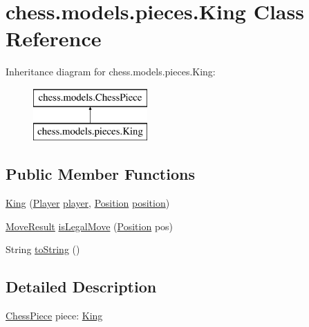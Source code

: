 \hypertarget{classchess_1_1models_1_1pieces_1_1_king}{}\section{chess.\+models.\+pieces.\+King Class Reference}
\label{classchess_1_1models_1_1pieces_1_1_king}
Inheritance diagram for chess.\+models.\+pieces.\+King\+:\begin{figure}[H]
\begin{center}
\leavevmode
\includegraphics[height=2.000000cm]{classchess_1_1models_1_1pieces_1_1_king}
\end{center}
\end{figure}
\subsection*{Public Member Functions}
\begin{DoxyCompactItemize}
\item 
\mbox{\hyperlink{classchess_1_1models_1_1pieces_1_1_king_abc06c6362a34a9f7289c374c50d3b728}{King}} (\mbox{\hyperlink{enumchess_1_1models_1_1enums_1_1_player}{Player}} \mbox{\hyperlink{classchess_1_1models_1_1_chess_piece_a3bcc8a24667318b5aab8c146adcc3eb7}{player}}, \mbox{\hyperlink{classchess_1_1models_1_1_position}{Position}} \mbox{\hyperlink{classchess_1_1models_1_1_chess_piece_a0e4f8616b75e548f269d3971846396f3}{position}})
\item 
\mbox{\hyperlink{enumchess_1_1models_1_1enums_1_1_move_result}{Move\+Result}} \mbox{\hyperlink{classchess_1_1models_1_1pieces_1_1_king_ad72471e97d1e053467189babdc18c231}{is\+Legal\+Move}} (\mbox{\hyperlink{classchess_1_1models_1_1_position}{Position}} pos)
\item 
String \mbox{\hyperlink{classchess_1_1models_1_1pieces_1_1_king_ae287258d6c093ce7d7c3196f7dde6d99}{to\+String}} ()
\end{DoxyCompactItemize}


\subsection{Detailed Description}
\mbox{\hyperlink{classchess_1_1models_1_1_chess_piece}{Chess\+Piece}} piece\+: \mbox{\hyperlink{classchess_1_1models_1_1pieces_1_1_king}{King}} 

